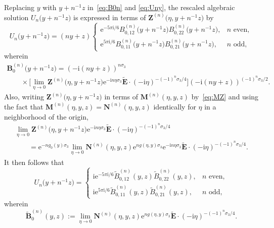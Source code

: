 Replacing $y$ with $y+n^{-1}z$ in~\eqref{eq:B0n} and \eqref{eq:Uny}, the rescaled algebraic solution $U_n\bigl(y+n^{-1}z\bigr)$ is expressed in terms of $\mathbf{Z}^{(n)}\bigl(\eta,y+n^{-1}z\bigr)$ by
\begin{equation*}
U_n\bigl(y+n^{-1}z\bigr) = (ny+z)\begin{cases}\mathrm{e}^{-5\pi\mathrm{i}/6}B^{(n)}_{0,12}\bigl(y+n^{-1}z\bigr)B^{(n)}_{0,22}\bigl(y+n^{-1}z\bigr),&\text{$n$ even},\\\mathrm{e}^{5\pi\mathrm{i}/6}B^{(n)}_{0,11}\bigl(y+n^{-1}z\bigr)B^{(n)}_{0,21}\bigl(y+n^{-1}z\bigr),&\text{$n$ odd},\end{cases}
\end{equation*}
wherein
\begin{gather*}
 \mathbf{B}_0^{(n)}\bigl(y+n^{-1}z\bigr)=(-\mathrm{i} (ny+z))^{n\sigma_3} \\
\qquad{}\times\Big[\lim_{\eta\to 0}\mathbf{Z}^{(n)}\bigl(\eta,y+n^{-1}z\bigr)\mathrm{e}^{-\mathrm{i} n\eta\sigma_3}\widetilde{\mathbf{E}}\cdot(-\mathrm{i} \eta)^{-(-1)^n\sigma_3/4}\Big](-\mathrm{i} (ny+z))^{(-1)^n\sigma_3/2}.
\end{gather*}
Also, writing $\mathbf{Z}^{(n)}\bigl(\eta,y+n^{-1}z\bigr)$ in terms of $\mathbf{M}^{(n)}(\eta,y,z)$ by~\eqref{eq:MZ} and using the fact that $\mathbf{M}^{(n)}(\eta,y,z)=\mathbf{N}^{(n)}(\eta,y,z)$ identically for $\eta$ in a neighborhood of the origin, %
\begin{gather*}
\lim_{\eta\to 0}\mathbf{Z}^{(n)}\bigl(\eta,y+n^{-1}z\bigr)\mathrm{e}^{-\mathrm{i} n\eta\sigma_3}\widetilde{\mathbf{E}}\cdot (-\mathrm{i}\eta)^{-(-1)^n\sigma_3/4} \\
\qquad = \mathrm{e}^{-ng_0(y)\sigma_3}\lim_{\eta\to 0}\mathbf{N}^{(n)}(\eta,y,z)\mathrm{e}^{ng(\eta,y)\sigma_3}\mathrm{e}^{-\mathrm{i} n\eta\sigma_3}\widetilde{\mathbf{E}}\cdot (-\mathrm{i}\eta)^{-(-1)^n\sigma_3/4}.
\end{gather*}
It then follows that
\begin{equation*}
U_n\bigl(y+n^{-1}z\bigr) = \begin{cases}\mathrm{i}\mathrm{e}^{-5\pi\mathrm{i}/6}\widetilde{B}^{(n)}_{0,12}(y,z)\widetilde{B}^{(n)}_{0,22}(y,z),&\text{$n$ even},\\\mathrm{i}\mathrm{e}^{5\pi\mathrm{i}/6}\widetilde{B}^{(n)}_{0,11}(y,z)\widetilde{B}^{(n)}_{0,21}(y,z),&\text{$n$ odd},\end{cases}
\end{equation*}
wherein
\begin{equation*}
\widetilde{\mathbf{B}}^{(n)}_0(y,z):=\lim_{\eta\to 0}\mathbf{N}^{(n)}(\eta,y,z)\mathrm{e}^{ng(\eta,y)\sigma_3}\widetilde{\mathbf{E}}\cdot (-\mathrm{i}\eta)^{-(-1)^n\sigma_3/4}.
\end{equation*}
